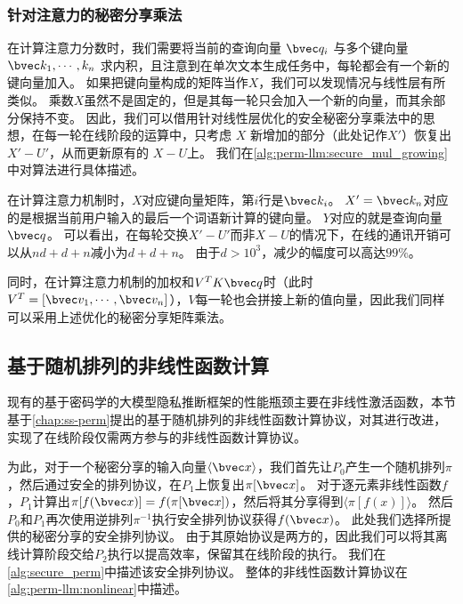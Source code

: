 \subsubsection{针对注意力的秘密分享乘法}
在计算注意力分数时，我们需要将当前的查询向量 $\bvec q_i$ 与多个键向量 $\bvec k_1, \cdots, k_n$ 求内积，且注意到在单次文本生成任务中，每轮都会有一个新的键向量加入。
%
如果把键向量构成的矩阵当作$X$，我们可以发现情况与线性层有所类似。
乘数$X$虽然不是固定的，但是其每一轮只会加入一个新的向量，而其余部分保持不变。
%
因此，我们可以借用针对线性层优化的安全秘密分享乘法中的思想，在每一轮在线阶段的运算中，只考虑 $X$ 新增加的部分（此处记作$X'$）恢复出 $X' - U'$，从而更新原有的 $X - U$上。
%
我们在\autoref{alg:perm-llm:secure_mul_growing}中对算法进行具体描述。



在计算注意力机制时，$X$对应键向量矩阵，第$i$行是$\bvec k_i$。
$X' = \bvec k_n$对应的是根据当前用户输入的最后一个词语新计算的键向量。
%
$Y$对应的就是查询向量 $\bvec q$。
%
可以看出，在每轮交换$X' - U'$而非$X - U$的情况下，在线的通讯开销可以从$nd + d + n$减小为$d + d + n$。
%
由于$d > 10^3$，减少的幅度可以高达$99\%$。

同时，在计算注意力机制的加权和$V^TK \bvec q$时（此时$V^T = [\bvec v_1, \cdots, \bvec v_n]$），$V$每一轮也会拼接上新的值向量，因此我们同样可以采用上述优化的秘密分享矩阵乘法。


\subsection{基于随机排列的非线性函数计算}
现有的基于密码学的大模型隐私推断框架的性能瓶颈主要在非线性激活函数，本节基于\autoref{chap:ss-perm}提出的基于随机排列的非线性函数计算协议，对其进行改进，实现了在线阶段仅需两方参与的非线性函数计算协议。
%

为此，对于一个秘密分享的输入向量$\langle \bvec x \rangle$，我们首先让$P_0$产生一个随机排列$\pi$，然后通过安全的排列协议，在$P_1$上恢复出$\pi[\bvec x]$。
对于逐元素非线性函数$f$，$P_1$计算出$\pi[f(\bvec x)] = f(\pi[\bvec x])$，然后将其分享得到$\langle \pi[f(x)] \rangle$。
%
然后$P_0$和$P_1$再次使用逆排列$\pi^{-1}$执行安全排列协议获得$f(\bvec x)$。
%
此处我们选择\cite{}所提供的秘密分享的安全排列协议。
由于其原始协议是两方的，因此我们可以将其离线计算阶段交给$P_2$执行以提高效率，保留其在线阶段的执行。
%
我们在\autoref{alg:secure_perm}中描述该安全排列协议。
整体的非线性函数计算协议在\autoref{alg:perm-llm:nonlinear}中描述。

